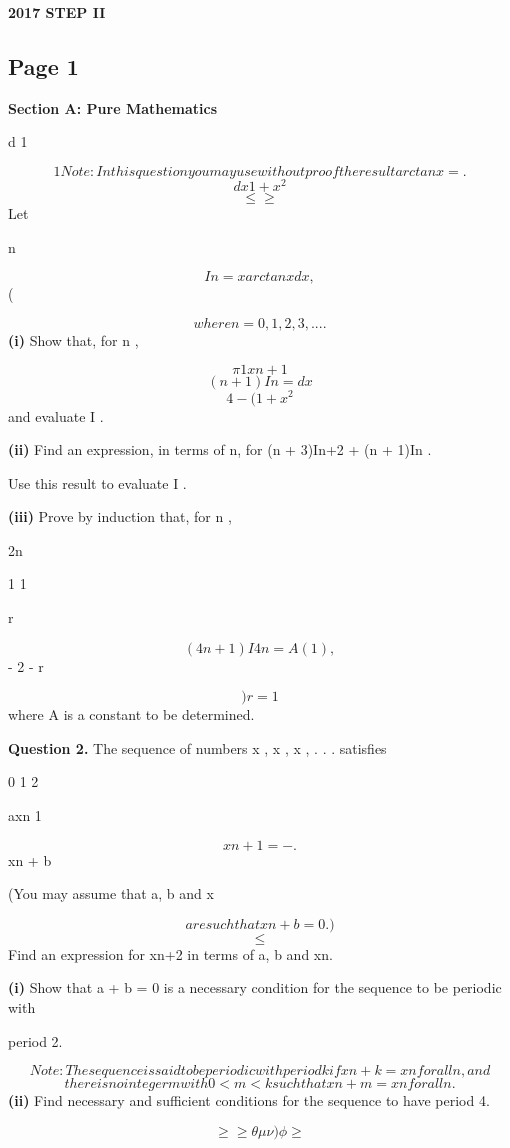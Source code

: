 \documentclass[12pt]{article}
\begin{document}
\begin{center}
{\Large \textbf{2017 STEP II}}
\end{center}

\subsection*{Page 1}
\begin{flushleft}
\bigskip\textbf{Section A: Pure Mathematics}\par
d 1\par
\[1 Note: In this question you may use without proof the result arctan x = .\]
\[dx 1 + x^2\]
\[\leq \geq\]
Let\par
n\par
\[In = x arctan x dx ,\]
(\par
\[where n = 0, 1, 2, 3, . . . .\]
\textbf{(i)} Show that, for n  ,\par
\[\pi 1 x n+1\]
\[(n + 1)In = dx\]
\[4 - ( 1 + x^2\]
and evaluate I .\par
\textbf{(ii)} Find an expression, in terms of n, for (n + 3)In+2 + (n + 1)In .\par
Use this result to evaluate I .\par
\textbf{(iii)} Prove by induction that, for n ,\par
2n\par
1 1\par
r\par
\[(4n + 1)I 4n = A ( 1) ,\]
- 2 - r\par
\[)r=1\]
where A is a constant to be determined.\par
\bigskip\textbf{Question 2.} The sequence of numbers x , x , x , . . . satisfies\par
0 1 2\par
axn 1\par
\[xn+1 = - .\]
xn + b\par
(You may assume that a, b and x\par
\[are such that xn + b = 0 .)\]
\[\leq\]
Find an expression for xn+2 in terms of a, b and xn.\par
\textbf{(i)} Show that a + b = 0 is a necessary condition for the sequence to be periodic with\par
period 2.\par
\[Note: The sequence is said to be periodic with period k if xn+k = xn for all n, and\]
\[there is no integer m with 0 < m < k such that xn+m = xn for all n.\]
\textbf{(ii)} Find necessary and sufficient conditions for the sequence to have period 4.\par
\[\geq\geq\theta\mu\nu) \phi \geq\]
\end{flushleft}
\end{document}
